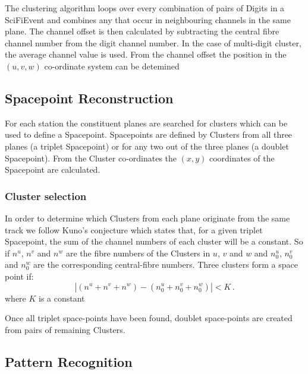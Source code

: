   The clustering algorithm loops over every combination of pairs of Digits in a SciFiEvent and combines any that occur in neighbouring channels in the same plane. The channel offset is then calculated by subtracting the central fibre channel number from the digit channel number. In the case of multi-digit cluster, the average channel value is used. From the channel offset the position in the  $(u,v,w)$ co-ordinate system can be detemined

  \subsection{Spacepoint Reconstruction}
  \label{subsec:SpacepointReconstruction}
  For each station the constituent planes are searched for clusters which can be used to define a Spacepoint. Spacepoints are defined by Clusters from all three planes (a triplet Spacepoint) or for any two out of the three planes (a doublet Spacepoint). 
  From the Cluster co-ordinates the $(x, y)$ coordinates of the Spacepoint are calculated.

  \subsubsection{Cluster selection}
  \label{subsubsec:ClusterSelection}
  In order to determine which Clusters from each plane originate from the same track we follow Kuno's conjecture\cite{MiceTrackers} which states that, for a given triplet Spacepoint, the sum of the channel numbers of each cluster will be a constant.  So if $n^u$, $n^v$ and $n^w$ are the fibre numbers of the Clusters in $u$, $v$ and $w$ and $n^u_0$, $n^v_0$ and $n^w_0$ are the corresponding central-fibre numbers. Three clusters form a space point  if:
  \begin{equation}
    | (n^u + n^v + n^w) - (n^u_0 + n^v_0 + n^w_0) | < K \, .
  \end{equation}
  where $K$ is a constant %
  
  Once all triplet space-points have been found, doublet space-points are created from pairs of remaining Clusters. 


  \subsection{Pattern Recognition}
  \label{subsec:PatternRecognition}

